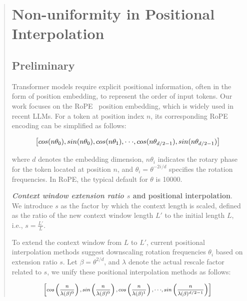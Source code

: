 \begin{abstract}
\section{Non-uniformity in Positional Interpolation}
\label{sec:analysis}

\subsection{Preliminary}

Transformer models require explicit positional information, often in the form of position embedding, to represent the order of input tokens. Our work focuses on the RoPE~\cite{rope} position embedding, which is widely used in recent  LLMs. For a token at position index $n$, its corresponding RoPE encoding can be simplified as follows:

\begin{equation}
		\fontsize{7.8}{7.8} \selectfont
	\label{eq:rope}
	\left[ cos(n\theta_0), sin(n\theta_0), cos(n\theta_1), \cdot\cdot\cdot, cos(n\theta_{d/2-1}), sin(n\theta_{d/2-1}) \right]   
\end{equation}

where $d$ denotes the embedding dimension, 
 $n\theta_i$ indicates the rotary phase for the token located at position $n$, 
and $\theta_i=\theta^{-2i/d}$ specifies the rotation frequencies. In RoPE, the typical default for $\theta$ is 10000. 

\textbf{\emph{Context window extension ratio $s$} and positional interpolation}. We introduce $s$ as the factor by which the context length is scaled, defined as the ratio of the new context window length $L'$ to the initial length $L$, i.e., $s = \frac{L'}{L}$.

To extend the context window from $L$ to $L'$, current positional interpolation methods suggest downscaling rotation frequencies $\theta_i$ based on extension ratio $s$. Let $\beta=\theta^{2/d}$, and $\lambda$ denote the actual rescale factor related to $s$, we   unify these positional interpolation methods as follows:

\begin{equation}	
	\fontsize{7.5}{7.5} \selectfont
	\label{eq:unified_rope}
	\begin{aligned}
		\left[cos\left(\frac{n}{\lambda(\beta)^0}\right), sin \left(\frac{n}{\lambda(\beta)^0}\right), cos\left(\frac{n}{\lambda(\beta)^1}\right), \cdot\cdot\cdot,  sin \left(\frac{n}{\lambda(\beta)^{d/2-1}}\right) \right]   
	\end{aligned}
\end{equation}


\end{abstract}
